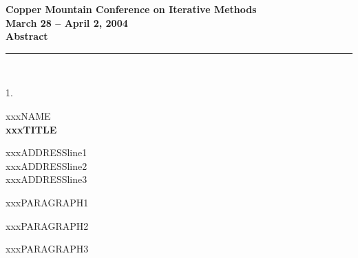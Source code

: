 \documentclass{report}
\begin{document}
\begin{center}
{\Large \bf Copper Mountain Conference on Iterative Methods} \\
{\large \bf March 28 -- April 2, 2004} \\
{\huge \bf Abstract}
\end{center}


\begin{center}
\rule{6in}{1pt}\\
{\large 1. \rule{0mm}{1.5em} xxxNAME \\
{\bf xxxTITLE }}
\end{center}

\begin{center}
	xxxADDRESSline1 \\
	xxxADDRESSline2 \\
	xxxADDRESSline3
\end{center}

xxxPARAGRAPH1

xxxPARAGRAPH2

xxxPARAGRAPH3
\end{document}
